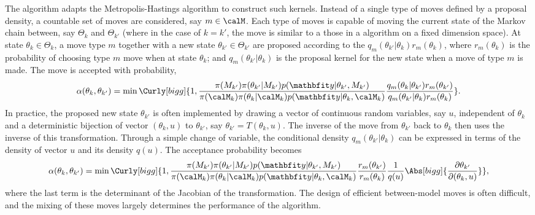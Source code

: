 The \rjmcmc algorithm adapts the Metropolis-Hastings algorithm to construct
such kernels. Instead of a single type of moves defined by a proposal density,
a countable set of moves are considered, say $m\in\calM$. Each type of moves
is capable of moving the current state of the Markov chain between, say
$\Theta_k$ and $\Theta_{k'}$ (where in the case of $k = k'$, the move is
similar to a those in a \mcmc algorithm on a fixed dimension space). At state
$\theta_k\in\Theta_k$, a move type $m$ together with a new state
$\theta_{k'}\in\Theta_{k'}$ are proposed according to the
$q_m(\theta_{k'}|\theta_k)r_m(\theta_k)$, where $r_m(\theta_k)$ is the
probability of choosing type $m$ move when at state $\theta_k$; and
$q_m(\theta_{k'}|\theta_k)$ is the proposal kernel for the new state when a
move of type $m$ is made. The move is accepted with probability,
\begin{equation}
  \alpha(\theta_k,\theta_{k'}) =
  \min\Curly[bigg]{1,
    \frac{\pi(M_{k'})\pi(\theta_{k'}|M_{k'})p(\data|\theta_{k'},M_{k'})}
    {\pi(\calM_k)\pi(\theta_k|\calM_k)p(\data|\theta_k,\calM_k)}
    \frac{q_m(\theta_k|\theta_{k'})r_m(\theta_{k'})}
    {q_m(\theta_{k'}|\theta_k)r_m(\theta_k)}
  }.
\end{equation}
In practice, the proposed new state $\theta_{k'}$ is often implemented by
drawing a vector of continuous random variables, say $u$, independent of
$\theta_k$ and a deterministic bijection of vector $(\theta_k,u)$ to
$\theta_{k'}$, say $\theta_{k'} = T(\theta_k,u)$. The inverse of the move from
$\theta_{k'}$ back to $\theta_k$ then uses the inverse of this transformation.
Through a simple change of variable, the conditional density
$q_m(\theta_{k'}|\theta_k)$ can be expressed in terms of the density of vector
$u$ and its density $q(u)$. The acceptance probability becomes
\begin{equation}
  \alpha(\theta_k,\theta_{k'}) =
  \min\Curly[bigg]{1,
    \frac{\pi(M_{k'})\pi(\theta_{k'}|M_{k'})p(\data|\theta_{k'},M_{k'})}
    {\pi(\calM_k)\pi(\theta_k|\calM_k)p(\data|\theta_k,\calM_k)}
    \frac{r_m(\theta_{k'})}{r_m(\theta_k)}
    \frac{1}{q(u)}\Abs[bigg]{\frac{\partial\theta_{k'}}{\partial(\theta_k,u)}}
  },
\end{equation}
where the last term is the determinant of the Jacobian of the transformation.
The design of efficient between-model moves is often difficult, and the mixing
of these moves largely determines the performance of the algorithm.

